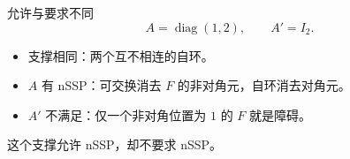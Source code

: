 \documentclass{beamer}
\begin{document}
\begin{frame}{允许与要求不同}
\[
 A=\operatorname{diag}(1,2),\qquad A'=I_2.
\]
\begin{itemize}
\item 支撑相同：两个互不相连的自环。
\item $A$ 有 nSSP：可交换消去 $F$ 的非对角元，自环消去对角元。
\item $A'$ 不满足：仅一个非对角位置为 $1$ 的 $F$ 就是障碍。
\end{itemize}
\alert{这个支撑允许 nSSP，却不要求 nSSP。}
\end{frame}
\end{document}

